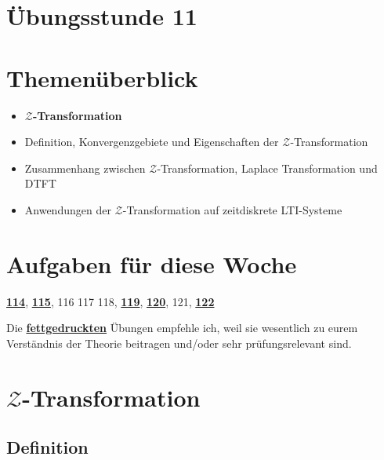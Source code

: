 \documentclass[11pt]{article}
\begin{document}
\thispagestyle{firstpage}

\setlength{\headheight}{1 \baselineskip}  %
\setlength{\parindent}{0pt}  %
\setlength{\parskip}{\baselineskip}  %

\vspace*{-5px}
\section*{Übungsstunde 11}

\section*{Themenüberblick}
\begin{itemize}
    \item \textbf{$\mathcal{Z}$-Transformation}
    \item[] Definition, Konvergenzgebiete und Eigenschaften der $\mathcal{Z}$-Transformation
    \item[] Zusammenhang zwischen $\mathcal{Z}$-Transformation, Laplace Transformation und DTFT
    \item[] Anwendungen der $\mathcal{Z}$-Transformation auf zeitdiskrete LTI-Systeme
\end{itemize}

\section*{Aufgaben für diese Woche}
\vspace{-0.5cm}

\underline{\textbf{114}}, \underline{\textbf{115}}, 116 117 118, \underline{\textbf{119}}, \underline{\textbf{120}}, 121, \underline{\textbf{122}}\\
\vspace{-0.5cm}

Die \underline{\textbf{fettgedruckten}} Übungen empfehle ich, weil sie wesentlich zu eurem Verständnis der Theorie beitragen und/oder sehr prüfungsrelevant sind.

\vfill \null
\pagebreak

\section*{$\mathcal{Z}$-Transformation}
\vspace*{-0.5cm}
\subsection*{Definition}
\vspace*{-0.5cm}
%
\end{document}
